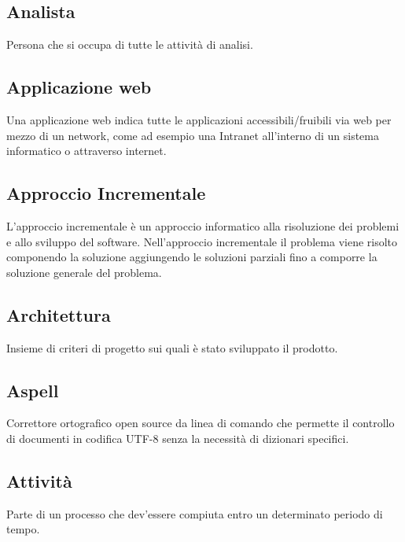 \documentclass[../glossario.tex]{subfiles}
\begin{document}
\subsection*{Analista}
{}
Persona che si occupa di tutte le attività di analisi.

\subsection*{Applicazione web}
{}
Una applicazione web indica tutte le applicazioni accessibili/fruibili via web per mezzo di un network, come ad esempio una Intranet all'interno di un sistema informatico o attraverso internet.

\subsection*{Approccio Incrementale}
{}
L'approccio incrementale è un approccio informatico alla risoluzione dei problemi e allo sviluppo del software. Nell'approccio incrementale il problema viene risolto componendo la soluzione aggiungendo le soluzioni parziali fino a comporre la soluzione generale del problema.

\subsection*{Architettura}
{}
Insieme di criteri di progetto sui quali è stato sviluppato il prodotto.

\subsection*{Aspell}
{}
Correttore ortografico open source da linea di comando che permette il controllo di documenti in codifica UTF-8 senza la necessità di dizionari specifici.

\subsection*{Attività}
{}
Parte di un processo che dev'essere compiuta entro un determinato periodo di tempo.
\end{document}
